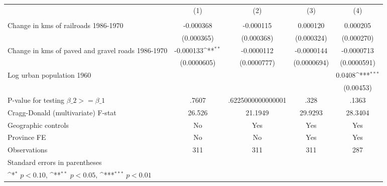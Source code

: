{
\def\sym#1{\ifmmode^{#1}\else\(^{#1}\)\fi}
\begin{tabular}{l*{4}{c}}
\hline\hline
                &\multicolumn{1}{c}{(1)}&\multicolumn{1}{c}{(2)}&\multicolumn{1}{c}{(3)}&\multicolumn{1}{c}{(4)}\\
                &\multicolumn{1}{c}{}&\multicolumn{1}{c}{}&\multicolumn{1}{c}{}&\multicolumn{1}{c}{}\\
\hline
Change in kms of railroads 1986-1970&-0.000368         &-0.000115         & 0.000120         & 0.000205         \\
                &(0.000365)         &(0.000368)         &(0.000324)         &(0.000270)         \\
[1em]
Change in kms of paved and gravel roads 1986-1970&-0.000133\sym{**} &-0.0000112         &-0.0000144         &-0.0000713         \\
                &(0.0000605)         &(0.0000777)         &(0.0000694)         &(0.0000591)         \\
[1em]
Log urban population 1960&                  &                  &                  &   0.0408\sym{***}\\
                &                  &                  &                  &(0.00453)         \\
\hline
P-value for testing $\beta\_{2} >= \beta\_{1}$&    .7607         &.6225000000000001         &     .328         &    .1363         \\
Cragg-Donald (multivariate) F-stat&   26.526         &  21.1949         &  29.9293         &  28.3404         \\
Geographic controls&       No         &      Yes         &      Yes         &      Yes         \\
Province FE     &       No         &       No         &      Yes         &      Yes         \\
Observations    &      311         &      311         &      311         &      287         \\
\hline\hline
\multicolumn{5}{l}{\footnotesize Standard errors in parentheses}\\
\multicolumn{5}{l}{\footnotesize \sym{*} \(p<0.10\), \sym{**} \(p<0.05\), \sym{***} \(p<0.01\)}\\
\end{tabular}
}
